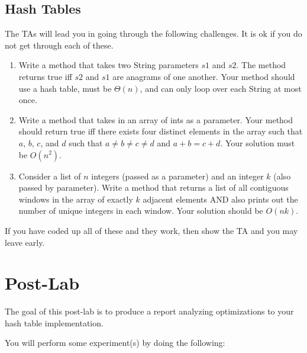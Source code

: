 \documentclass[paper=a4, fontsize=11pt, parskip=full]{scrartcl} %
\numberwithin{equation}{section} %
\numberwithin{figure}{section} %
\numberwithin{table}{section} %
\begin{document}
\subsection{Hash Tables}

The TAs will lead you in going through the following challenges. It is ok if you do not get through each of these.

\begin{enumerate}
	\item Write a method that takes two String parameters $s1$ and $s2$. The method returns true iff $s2$ and $s1$ are anagrams of one another. Your method should use a hash table, must be $\Theta(n)$, and can only loop over each String at most once.
	\item Write a method that takes in an array of ints as a parameter. Your method should return true iff there exists four distinct elements in the array such that $a$, $b$, $c$, and $d$ such that $a \neq b \neq c \neq d$ and $a+b = c+d$. Your solution must be $O(n^2)$.
	\item Consider a list of $n$ integers (passed as a parameter) and an integer $k$ (also passed by parameter). Write a method that returns a list of all contiguous windows in the array of exactly $k$ adjacent elements AND also prints out the number of unique integers in each window. Your solution should be $O(nk)$.
\end{enumerate}

If you have coded up all of these and they work, then show the TA and you may leave early.




\newpage
\section{Post-Lab}

The goal of this post-lab is to produce a report analyzing optimizations to your hash table implementation. 

You will perform some experiment(s) by doing the following:
\end{document}
